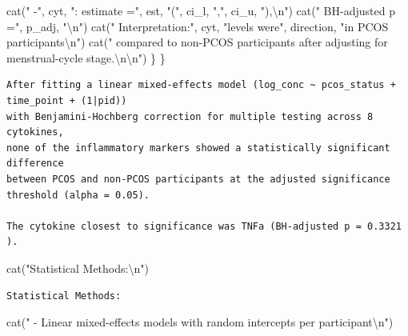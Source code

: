 \documentclass[
  letterpaper,
  DIV=11,
  numbers=noendperiod]{scrartcl}
\newenvironment{Shaded}{\begin{snugshade}}{\end{snugshade}}
\newcommand{\FunctionTok}[1]{\textcolor[rgb]{0.28,0.35,0.67}{#1}}
\newcommand{\NormalTok}[1]{\textcolor[rgb]{0.00,0.23,0.31}{#1}}
\newcommand{\SpecialCharTok}[1]{\textcolor[rgb]{0.37,0.37,0.37}{#1}}
\newcommand{\StringTok}[1]{\textcolor[rgb]{0.13,0.47,0.30}{#1}}
\newcounter{none} %
\begin{document}
\begin{Shaded}
\begin{Highlighting}[]
    \FunctionTok{cat}\NormalTok{(}\StringTok{"  {-}"}\NormalTok{, cyt, }\StringTok{": estimate ="}\NormalTok{, est, }\StringTok{"("}\NormalTok{, ci\_l, }\StringTok{","}\NormalTok{, ci\_u, }\StringTok{"),}\SpecialCharTok{\textbackslash{}n}\StringTok{"}\NormalTok{)}
    \FunctionTok{cat}\NormalTok{(}\StringTok{"    BH{-}adjusted p ="}\NormalTok{, p\_adj, }\StringTok{"}\SpecialCharTok{\textbackslash{}n}\StringTok{"}\NormalTok{)}
    \FunctionTok{cat}\NormalTok{(}\StringTok{"    Interpretation:"}\NormalTok{, cyt, }\StringTok{"levels were"}\NormalTok{, direction, }\StringTok{"in PCOS participants}\SpecialCharTok{\textbackslash{}n}\StringTok{"}\NormalTok{)}
    \FunctionTok{cat}\NormalTok{(}\StringTok{"    compared to non{-}PCOS participants after adjusting for menstrual{-}cycle stage.}\SpecialCharTok{\textbackslash{}n\textbackslash{}n}\StringTok{"}\NormalTok{)}
\NormalTok{  \}}
\NormalTok{\}}
\end{Highlighting}
\end{Shaded}

\begin{verbatim}
After fitting a linear mixed-effects model (log_conc ~ pcos_status + time_point + (1|pid))
with Benjamini-Hochberg correction for multiple testing across 8 cytokines,
none of the inflammatory markers showed a statistically significant difference
between PCOS and non-PCOS participants at the adjusted significance threshold (alpha = 0.05).

The cytokine closest to significance was TNFa (BH-adjusted p = 0.3321 ).
\end{verbatim}

\begin{Shaded}
\begin{Highlighting}[]
\FunctionTok{cat}\NormalTok{(}\StringTok{"Statistical Methods:}\SpecialCharTok{\textbackslash{}n}\StringTok{"}\NormalTok{)}
\end{Highlighting}
\end{Shaded}

\begin{verbatim}
Statistical Methods:
\end{verbatim}

\begin{Shaded}
\begin{Highlighting}[]
\FunctionTok{cat}\NormalTok{(}\StringTok{"  {-} Linear mixed{-}effects models with random intercepts per participant}\SpecialCharTok{\textbackslash{}n}\StringTok{"}\NormalTok{)}
\end{Highlighting}
\end{Shaded}
\end{document}
